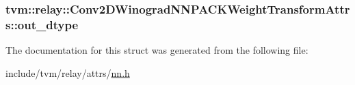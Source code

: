 \subsubsection[{\texorpdfstring{out\+\_\+dtype}{out_dtype}}]{ tvm\+::relay\+::\+Conv2\+D\+Winograd\+N\+N\+P\+A\+C\+K\+Weight\+Transform\+Attrs\+::out\+\_\+dtype}\hypertarget{structtvm_1_1relay_1_1Conv2DWinogradNNPACKWeightTransformAttrs_a1c76da4597774015e5417f2f8592ad5c}{}\label{structtvm_1_1relay_1_1Conv2DWinogradNNPACKWeightTransformAttrs_a1c76da4597774015e5417f2f8592ad5c}


The documentation for this struct was generated from the following file\+:\begin{DoxyCompactItemize}
\item 
include/tvm/relay/attrs/\hyperlink{include_2tvm_2relay_2attrs_2nn_8h}{nn.\+h}\end{DoxyCompactItemize}
